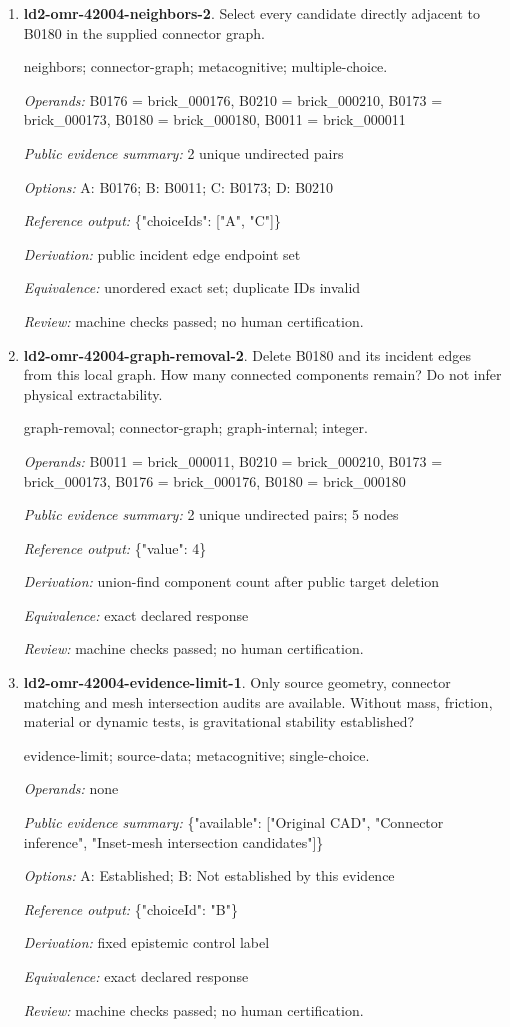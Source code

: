 \begin{enumerate}
\item \textbf{ld2-omr-42004-neighbors-2}. Select every candidate directly adjacent to B0180 in the supplied connector graph.
\par{\small neighbors; connector-graph; metacognitive; multiple-choice.\par\textit{Operands:} B0176 = brick\_000176, B0210 = brick\_000210, B0173 = brick\_000173, B0180 = brick\_000180, B0011 = brick\_000011\par\textit{Public evidence summary:} 2 unique undirected pairs\par\textit{Options:} A: B0176; B: B0011; C: B0173; D: B0210\par\textit{Reference output:} \{"choiceIds": ["A", "C"]\}\par\textit{Derivation:} public incident edge endpoint set\par\textit{Equivalence:} unordered exact set; duplicate IDs invalid\par\textit{Review:} machine checks passed; no human certification.}
\item \textbf{ld2-omr-42004-graph-removal-2}. Delete B0180 and its incident edges from this local graph. How many connected components remain? Do not infer physical extractability.
\par{\small graph-removal; connector-graph; graph-internal; integer.\par\textit{Operands:} B0011 = brick\_000011, B0210 = brick\_000210, B0173 = brick\_000173, B0176 = brick\_000176, B0180 = brick\_000180\par\textit{Public evidence summary:} 2 unique undirected pairs; 5 nodes\par\textit{Reference output:} \{"value": 4\}\par\textit{Derivation:} union-find component count after public target deletion\par\textit{Equivalence:} exact declared response\par\textit{Review:} machine checks passed; no human certification.}
\item \textbf{ld2-omr-42004-evidence-limit-1}. Only source geometry, connector matching and mesh intersection audits are available. Without mass, friction, material or dynamic tests, is gravitational stability established?
\par{\small evidence-limit; source-data; metacognitive; single-choice.\par\textit{Operands:} none\par\textit{Public evidence summary:} \{"available": ["Original CAD", "Connector inference", "Inset-mesh intersection candidates"]\}\par\textit{Options:} A: Established; B: Not established by this evidence\par\textit{Reference output:} \{"choiceId": "B"\}\par\textit{Derivation:} fixed epistemic control label\par\textit{Equivalence:} exact declared response\par\textit{Review:} machine checks passed; no human certification.}

\end{enumerate}
